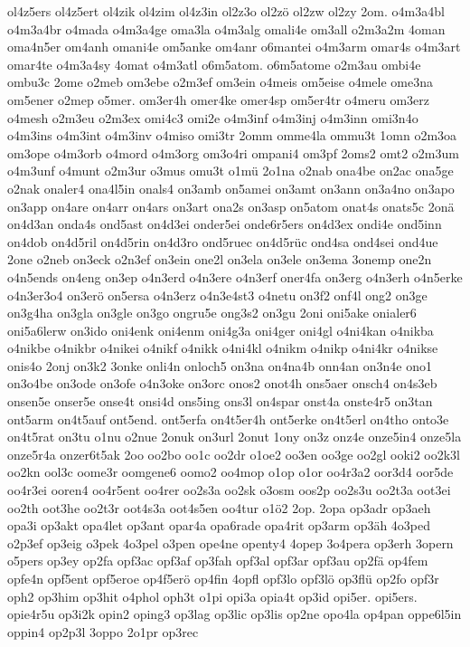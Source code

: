{ol4z5ers
ol4z5ert
ol4zik
ol4zim
ol4z3in
ol2z3o
ol2zö
ol2zw
ol2zy
2om.
o4m3a4bl
o4m3a4br
o4mada
o4m3a4ge
oma3la
o4m3alg
omali4e
om3all
o2m3a2m
4oman
oma4n5er
om4anh
omani4e
om5anke
om4anr
o6mantei
o4m3arm
omar4s
o4m3art
omar4te
o4m3a4sy
4omat
o4m3atl
o6m5atom.
o6m5atome
o2m3au
ombi4e
ombu3c
2ome
o2meb
om3ebe
o2m3ef
om3ein
o4meis
om5eise
o4mele
ome3na
om5ener
o2mep
o5mer.
om3er4h
omer4ke
omer4sp
om5er4tr
o4meru
om3erz
o4mesh
o2m3eu
o2m3ex
omi4c3
omi2e
o4m3inf
o4m3inj
o4m3inn
omi3n4o
o4m3ins
o4m3int
o4m3inv
o4miso
omi3tr
2omm
omme4la
ommu3t
1omn
o2m3oa
om3ope
o4m3orb
o4mord
o4m3org
om3o4ri
ompani4
om3pf
2oms2
omt2
o2m3um
o4m3unf
o4munt
o2m3ur
o3mus
omu3t
o1mü
2o1na
o2nab
ona4be
on2ac
ona5ge
o2nak
onaler4
ona4l5in
onals4
on3amb
on5amei
on3amt
on3ann
on3a4no
on3apo
on3app
on4are
on4arr
on4ars
on3art
ona2s
on3asp
on5atom
onat4s
onats5c
2onä
on4d3an
onda4s
ond5ast
on4d3ei
onder5ei
onde6r5ers
on4d3ex
ondi4e
ond5inn
on4dob
on4d5ril
on4d5rin
on4d3ro
ond5ruec
on4d5rüc
ond4sa
ond4sei
ond4ue
2one
o2neb
on3eck
o2n3ef
on3ein
one2l
on3ela
on3ele
on3ema
3onemp
one2n
o4n5ends
on4eng
on3ep
o4n3erd
o4n3ere
o4n3erf
oner4fa
on3erg
o4n3erh
o4n5erke
o4n3er3o4
on3erö
on5ersa
o4n3erz
o4n3e4st3
o4netu
on3f2
onf4l
ong2
on3ge
on3g4ha
on3gla
on3gle
on3go
ongru5e
ong3s2
on3gu
2oni
oni5ake
onialer6
oni5a6lerw
on3ido
oni4enk
oni4enm
oni4g3a
oni4ger
oni4gl
o4ni4kan
o4nikba
o4nikbe
o4nikbr
o4nikei
o4nikf
o4nikk
o4ni4kl
o4nikm
o4nikp
o4ni4kr
o4nikse
onis4o
2onj
on3k2
3onke
onli4n
onloch5
on3na
on4na4b
onn4an
on3n4e
ono1
on3o4be
on3ode
on3ofe
o4n3oke
on3orc
onos2
onot4h
ons5aer
onsch4
on4s3eb
onsen5e
onser5e
onse4t
onsi4d
ons5ing
ons3l
on4spar
onst4a
onste4r5
on3tan
ont5arm
on4t5auf
ont5end.
ont5erfa
on4t5er4h
ont5erke
on4t5erl
on4tho
onto3e
on4t5rat
on3tu
o1nu
o2nue
2onuk
on3url
2onut
1ony
on3z
onz4e
onze5in4
onze5la
onze5r4a
onzer6t5ak
2oo
oo2bo
oo1c
oo2dr
o1oe2
oo3en
oo3ge
oo2gl
ooki2
oo2k3l
oo2kn
ool3c
oome3r
oomgene6
oomo2
oo4mop
o1op
o1or
oo4r3a2
oor3d4
oor5de
oo4r3ei
ooren4
oo4r5ent
oo4rer
oo2s3a
oo2sk
o3osm
oos2p
oo2s3u
oo2t3a
oot3ei
oo2th
oot3he
oo2t3r
oot4s3a
oot4s5en
oo4tur
o1ö2
2op.
2opa
op3adr
op3aeh
opa3i
op3akt
opa4let
op3ant
opar4a
opa6rade
opa4rit
op3arm
op3äh
4o3ped
o2p3ef
op3eig
o3pek
4o3pel
o3pen
ope4ne
openty4
4opep
3o4pera
op3erh
3opern
o5pers
op3ey
op2fa
opf3ac
opf3af
op3fah
opf3al
opf3ar
opf3au
op2fä
op4fem
opfe4n
opf5ent
opf5eroe
op4f5erö
op4fin
4opfl
opf3lo
opf3lö
op3flü
op2fo
opf3r
oph2
op3him
op3hit
o4phol
oph3t
o1pi
opi3a
opia4t
op3id
opi5er.
opi5ers.
opie4r5u
op3i2k
opin2
oping3
op3lag
op3lic
op3lis
op2ne
opo4la
op4pan
oppe6l5in
oppin4
op2p3l
3oppo
2o1pr
op3rec
}
